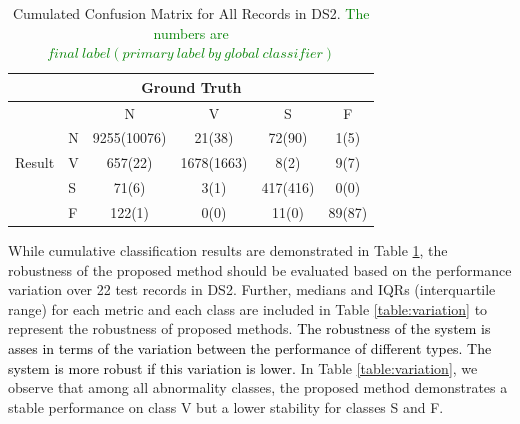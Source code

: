 \begin{table}[t]
	\centering
	\caption{Cumulated Confusion Matrix for All Records in DS2. \textcolor{green}{The numbers are $final~label(primary~label~by~global~ classifier)$}}
	\vspace{-0.05in}
	\begin{tabular}{|l|l|c|c|c|c|}
		\hline 
		&  \multicolumn{4}{c}{Ground Truth} &\\ 
        \hline
		\multirow{5}{*}{Result} &  & N & V & S & F  \\\cline{2-6}
		& N & 9255(10076)& 21(38) & 72(90) & 1(5) \\\cline{2-6} 
		&V & 657(22) & 1678(1663) & 8(2) & 9(7)  \\\cline{2-6}
		&S & 71(6) & 3(1) & 417(416) & 0(0)  \\\cline{2-6}
        &F& 122(1) & 0(0) & 11(0) & 89(87)  \\\hline
	\end{tabular}
	\label{table:classification_cumu} 
	\vspace{-0.15in}
\end{table}

While cumulative classification results are demonstrated in Table \ref{table:classification_cumu}, the robustness of the proposed method should be evaluated based on the performance variation over 22 test records in DS2. Further, medians and IQRs (interquartile range) for each metric and each class are included in Table \ref{table:variation} to represent the robustness of proposed methods. \textcolor{black}{The robustness of the system is asses in terms of the variation between the performance of different types. The system is more robust if this variation is lower.} 
In Table \ref{table:variation}, we observe that among all abnormality classes,  %
the proposed method demonstrates a stable performance on class V but a lower stability for classes S and F.


